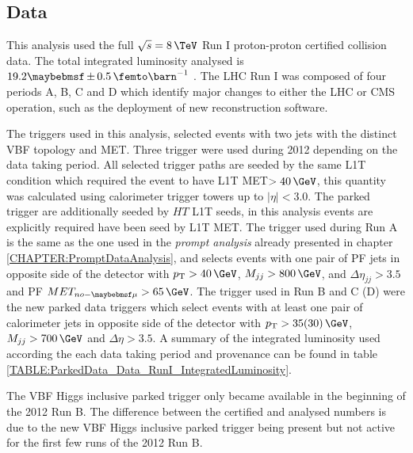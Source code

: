 \subsection{Data}


This analysis used the full  $\sqrt{s}=8\,\TeV$ Run I proton-proton certified collision data. The total integrated luminosity analysed is $19.2 \pm 0.5 \,\femto\barn^{-1}$ \cite{ARTICLE:CMSLuminosityBasedonPixelClusterCounting}. The \gls{LHC} Run I was composed of four periods A, B, C and D which identify major changes to either the \gls{LHC} or \gls{CMS} operation, such as the deployment of new reconstruction software.

The triggers used in this analysis, selected events with two jets with the distinct \gls{VBF} topology and \gls{MET}. Three trigger were used during 2012 depending on the data taking period. All selected trigger paths are seeded by the same \gls{L1T} condition which required the event to have \gls{L1T} \gls{MET}$>40\,\GeV$, this quantity was calculated using calorimeter trigger towers up to $|\eta|<3.0$. The parked trigger are additionally seeded by $HT$ \gls{L1T} seeds, in this analysis events are explicitly required have been seed by \gls{L1T} \gls{MET}. The trigger used during Run A is the same as the one used in the \textit{prompt analysis} already presented in chapter \ref{CHAPTER:PromptDataAnalysis}, and selects events with one pair of \gls{PF} jets in opposite side of the detector with $\pt>40\,\GeV$, $M_{jj}>800\,\GeV$, and $\Delta\eta_{jj}>3.5$ and \gls{PF} $MET_{no-\mu}>65\,\GeV$. The trigger used in Run B and C (D) were the new parked data triggers which select events with at least one pair of calorimeter jets in opposite side of the detector with $\pt>35(30)\,\GeV$, $M_{jj}>700\,\GeV$ and $\Delta\eta>3.5$. A summary of the integrated luminosity used according the each data taking period and provenance can be found in table \ref{TABLE:ParkedData_Data_RunI_IntegratedLuminosity}.



The \gls{VBF} Higgs inclusive parked trigger only became available in the beginning of the 2012 Run B. The difference between the certified and analysed numbers is due to the new \gls{VBF} Higgs inclusive parked trigger being present but not active for the first few runs of the 2012 Run B. 

